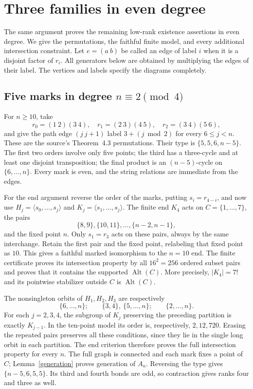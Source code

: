 \documentclass[11pt]{article}
\newcommand{\gen}[1]{\langle #1\rangle}
\newcommand{\Alt}{\operatorname{Alt}}
\begin{document}
\section{Three families in even degree}
The same argument proves the remaining low-rank existence assertions
in even degree. We give the permutations, the faithful finite model,
and every additional intersection constraint. Let $e=(a\ b)$ be called
an edge of label $i$ when it is a disjoint factor of $r_i$. All generators
below are obtained by multiplying the edges of their label. The vertices
and labels specify the diagrams completely.

\subsection{Five marks in degree $n\equiv2\pmod4$}
For $n\geq10$, take
\[
 r_0=(1\ 2)(3\ 4),\quad r_1=(2\ 3)(4\ 5),\quad
 r_2=(3\ 4)(5\ 6),
\]
and give the path edge $(j\ j+1)$ label $3+(j\bmod2)$ for every
$6\leq j<n$. These are the source's Theorem~4.3 permutations. Their
type is $\{5,5,6,n-5\}$. The first two orders involve only five
points; the third has a three-cycle and at least one disjoint
transposition; the final product is an $(n-5)$-cycle on $\{6,\ldots,n\}$.
Every mark is even, and the string relations are immediate from the
edges.

For the end argument reverse the order of the marks, putting
$s_i=r_{4-i}$, and now use $H_j=\gen{s_0,\ldots,s_j}$ and
$K_j=\gen{s_1,\ldots,s_j}$. The finite end $K_4$ acts on
$C=\{1,\ldots,7\}$, the pairs
\[
 \{8,9\},\{10,11\},\ldots,\{n-2,n-1\},
\]
and the fixed point $n$. Only $s_1=r_3$ acts on these pairs, always by
the same interchange. Retain the first pair and the fixed point,
relabeling that fixed point as $10$. This gives a faithful marked
isomorphism to the $n=10$ end. The finite certificate proves its
intersection property by all $16^2=256$ ordered subset pairs and proves
that it contains the supported $\Alt(C)$. More precisely, $|K_4|=7!$
and its pointwise stabilizer outside $C$ is $\Alt(C)$.

The nonsingleton orbits of $H_1,H_2,H_3$ are respectively
\[
 \{6,\ldots,n\};\qquad
 \{3,4\},\ \{5,\ldots,n\};\qquad
 \{2,\ldots,n\}.
\]
For each $j=2,3,4$, the subgroup of $K_j$ preserving the preceding
partition is exactly $K_{j-1}$. In the ten-point model its order is,
respectively, $2,12,720$. Erasing the repeated pairs preserves all these
conditions, since they lie in the single long orbit in each partition.
The end criterion therefore proves the full intersection property for
every $n$. The full graph is connected and each mark fixes a point of
$C$; Lemma~\ref{generation} proves generation of $A_n$.
Reversing the type gives $\{n-5,6,5,5\}$. Its third and fourth bonds
are odd, so contraction gives ranks four and three as well.
\end{document}
